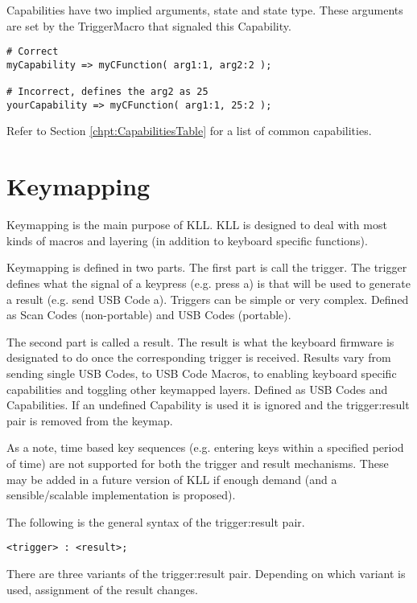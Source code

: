 \documentclass{kiibohd-template}
\begin{document}
Capabilities have two implied arguments, state and state type.
These arguments are set by the TriggerMacro that signaled this Capability.

\begin{lstlisting}
# Correct
myCapability => myCFunction( arg1:1, arg2:2 );

# Incorrect, defines the arg2 as 25
yourCapability => myCFunction( arg1:1, 25:2 );
\end{lstlisting}

Refer to Section \ref{chpt:CapabilitiesTable} for a list of common capabilities.


\chapter{Keymapping}

Keymapping is the main purpose of KLL.
KLL is designed to deal with most kinds of macros and layering (in addition to keyboard specific functions).

Keymapping is defined in two parts.
The first part is call the trigger.
The trigger defines what the signal of a keypress (e.g. press a) is that will be used to generate a result (e.g. send USB Code a).
Triggers can be simple or very complex.
Defined as Scan Codes (non-portable) and USB Codes (portable).

The second part is called a result.
The result is what the keyboard firmware is designated to do once the corresponding trigger is received.
Results vary from sending single USB Codes, to USB Code Macros, to enabling keyboard specific capabilities and toggling other keymapped layers.
Defined as USB Codes and Capabilities.
If an undefined Capability is used it is ignored and the trigger:result pair is removed from the keymap.

As a note, time based key sequences (e.g. entering keys within a specified period of time) are not supported for both the trigger and result mechanisms.
These may be added in a future version of KLL if enough demand (and a sensible/scalable implementation is proposed).

The following is the general syntax of the trigger:result pair.

\begin{lstlisting}
<trigger> : <result>;
\end{lstlisting}

There are three variants of the trigger:result pair.
Depending on which variant is used, assignment of the result changes.
\end{document}
